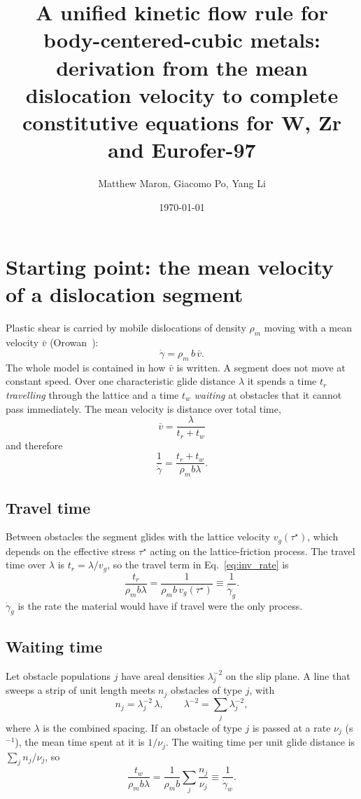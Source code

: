 \documentclass[11pt]{article}
\title{A unified kinetic flow rule for body-centered-cubic metals:\\ derivation from the mean dislocation velocity to complete constitutive equations for W, Zr and Eurofer-97}
\author{Matthew Maron, Giacomo Po, Yang Li}
\date{\today}
\newcommand{\gd}{\dot\gamma}
\newcommand{\ts}{\tau^{\star}}
\numberwithin{equation}{section}
\begin{document}
\maketitle
\tableofcontents
\newpage

\section{Starting point: the mean velocity of a dislocation segment}
Plastic shear is carried by mobile dislocations of density $\rho_m$ moving with a mean velocity $\bar v$ (Orowan~\cite{Orowan1940}):
\begin{equation}
\gd=\rho_m\,b\,\bar v .
\label{eq:orowan}
\end{equation}
The whole model is contained in how $\bar v$ is written. A segment does not move at constant speed. Over one characteristic glide distance $\lambda$ it spends a time $t_r$ \emph{travelling} through the lattice and a time $t_w$ \emph{waiting} at obstacles that it cannot pass immediately. The mean velocity is distance over total time,
\begin{equation}
\boxed{\;\bar v=\frac{\lambda}{t_r+t_w}\;}
\label{eq:vbar}
\end{equation}
and therefore
\begin{equation}
\frac{1}{\gd}=\frac{t_r+t_w}{\rho_m b\lambda}.
\label{eq:inv_rate}
\end{equation}

\subsection{Travel time}
Between obstacles the segment glides with the lattice velocity $v_g(\ts)$, which depends on the effective stress $\ts$ acting on the lattice-friction process. The travel time over $\lambda$ is $t_r=\lambda/v_g$, so the travel term in Eq.~\eqref{eq:inv_rate} is
\begin{equation}
\frac{t_r}{\rho_m b\lambda}=\frac{1}{\rho_m b\,v_g(\ts)}\equiv\frac{1}{\gd_g}.
\end{equation}
$\gd_g$ is the rate the material would have if travel were the only process.

\subsection{Waiting time}
Let obstacle populations $j$ have areal densities $\lambda_j^{-2}$ on the slip plane. A line that sweeps a strip of unit length meets $n_j$ obstacles of type $j$, with
\begin{equation}
n_j=\lambda_j^{-2}\,\lambda,\qquad \lambda^{-2}=\sum_j\lambda_j^{-2},
\end{equation}
where $\lambda$ is the combined spacing. If an obstacle of type $j$ is passed at a rate $\nu_j$ (s$^{-1}$), the mean time spent at it is $1/\nu_j$. The waiting time per unit glide distance is $\sum_j n_j/\nu_j$, so
\begin{equation}
\frac{t_w}{\rho_m b\lambda}=\frac{1}{\rho_m b}\sum_j\frac{n_j}{\nu_j}\equiv\frac{1}{\gd_w}.
\end{equation}
\end{document}
